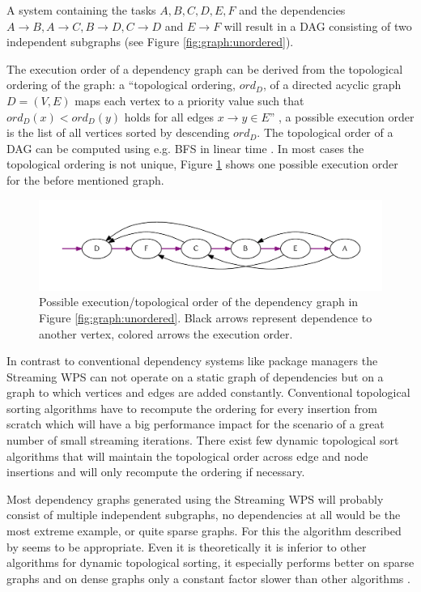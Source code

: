 		A system containing the tasks $A, B, C, D, E, F$ and the dependencies $A\rightarrow B, A\rightarrow C, B\rightarrow D, C\rightarrow D$ and $E\rightarrow F$ will result in a \ac{DAG} consisting of two independent subgraphs (see Figure \ref{fig:graph:unordered}).

		The execution order of a dependency graph can be derived from the topological ordering of the graph: a ``topological ordering, $ord_D$, of a directed acyclic graph $D = (V, E)$ maps each vertex to a priority value such that $ord_{D}(x) < ord_{D}(y)$ holds for all edges $x \rightarrow y \in E$'' \citep{pearce2007dynamic}, a possible execution order is the list of all vertices sorted by descending $ord_D$. The topological order of a \ac{DAG} can be computed using e.g. \ac{BFS} in linear time \citep{cormen2001introduction}. In most cases the topological ordering is not unique, Figure \ref{fig:graph:ordered} shows one possible execution order for the before mentioned graph.

		\begin{figure}[!htb]
			\centering
			\includegraphics[width=1\textwidth]{figures/ordered-graph.pdf} %
			\caption{\label{fig:graph:ordered}Possible execution/topological order of the dependency graph in Figure \ref{fig:graph:unordered}. Black arrows represent dependence to another vertex, colored arrows the execution order.}
		\end{figure}

		In contrast to conventional dependency systems like package managers the Streaming \ac{WPS} can not operate on a static graph of dependencies but on a graph to which vertices and edges are added constantly. Conventional topological sorting algorithms have to recompute the ordering for every insertion from scratch which will have a big performance impact for the scenario of a great number of small streaming iterations. There exist few dynamic topological sort algorithms that will maintain the topological order across edge and node insertions and will only recompute the ordering if necessary.

		Most dependency graphs generated using the Streaming \ac{WPS} will probably consist of multiple independent subgraphs, no dependencies at all would be the most extreme example, or quite sparse graphs. For this the algorithm described by \citet{pearce2007dynamic} seems to be appropriate. Even it is theoretically it is inferior to other algorithms for dynamic topological sorting, it especially performs better on sparse graphs and on dense graphs only a constant factor slower than other algorithms \citep{pearce2007dynamic}. %

